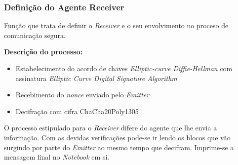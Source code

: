 \documentclass[12pt]{report}
\providecommand{\tightlist}{%
      \setlength{\itemsep}{0pt}\setlength{\parskip}{0pt}}
\begin{document}
    \hypertarget{definiuxe7uxe3o-do-agente-receiver}{%
\subsubsection{Definição do Agente
Receiver}\label{definiuxe7uxe3o-do-agente-receiver}}

Função que trata de definir o \emph{Receiver} e o seu envolvimento no
proceso de comunicação segura.

\textbf{Descrição do processo:}

\begin{itemize}
\tightlist
\item
  Estabelecimento do acordo de chaves \emph{Elliptic-curve
  Diffie-Hellman} com assinatura \emph{Elliptic Curve Digital Signature
  Algorithm}
\item
  Recebimento do \emph{nonce} enviado pelo \emph{Emitter}
\item
  Decifração com cifra ChaCha20Poly1305
\end{itemize}

O processo estipulado para o \emph{Receiver} difere do agente que lhe
envia a informação. Com as devidas verificações pode-se ir lendo os
blocos que vão surgindo por parte do \emph{Emitter} ao mesmo tempo que
decifram. Imprime-se a mensagem final no \emph{Notebook} em si.
\end{document}
